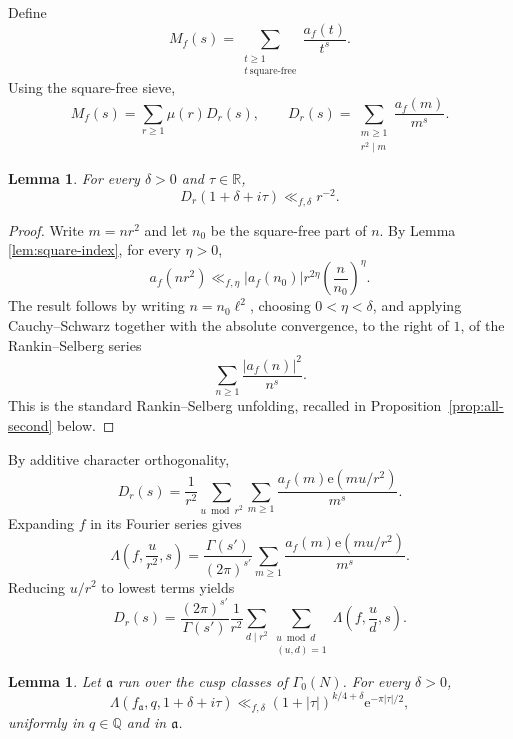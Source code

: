 \documentclass[11pt]{amsart}
\newtheorem{lemma}[theorem]{Lemma}
\theoremstyle{remark}
\newcommand{\e}{\mathrm{e}}
\newcommand{\R}{\mathbb R}
\newcommand{\Q}{\mathbb Q}
\begin{document}
Define
\[
M_f(s)=\sum_{\substack{t\ge1\\t\ \mathrm{square\text{-}free}}}\frac{a_f(t)}{t^s}.
\]
Using the square-free sieve,
\[
M_f(s)=\sum_{r\ge1}\mu(r)D_r(s),
\qquad
D_r(s)=\sum_{\substack{m\ge1\\r^2\mid m}}\frac{a_f(m)}{m^s}.
\tag{3.2}
\]

\begin{lemma}\label{lem:right-bound}
For every $\delta>0$ and $\tau\in\R$,
\[
D_r(1+\delta+i\tau)\ll_{f,\delta}r^{-2}.
\]
\end{lemma}

\begin{proof}
Write $m=nr^2$ and let $n_0$ be the square-free part of $n$. By Lemma \ref{lem:square-index}, for every $\eta>0$,
\[
a_f(nr^2)\ll_{f,\eta}|a_f(n_0)|r^{2\eta}\left(\frac n{n_0}\right)^\eta.
\]
The result follows by writing $n=n_0\ell^2$, choosing $0<\eta<\delta$, and applying Cauchy--Schwarz together with the absolute convergence, to the right of $1$, of the Rankin--Selberg series
\[
\sum_{n\ge1}\frac{|a_f(n)|^2}{n^s}.
\]
This is the standard Rankin--Selberg unfolding, recalled in
Proposition~\ref{prop:all-second} below.
\end{proof}

By additive character orthogonality,
\[
D_r(s)=\frac1{r^2}\sum_{u\bmod r^2}
\sum_{m\ge1}\frac{a_f(m)\e(mu/r^2)}{m^s}.
\tag{3.3}
\]
Expanding $f$ in its Fourier series gives
\[
\Lambda\left(f,\frac{u}{r^2},s\right)
=\frac{\Gamma(s')}{(2\pi)^{s'}}
\sum_{m\ge1}\frac{a_f(m)\e(mu/r^2)}{m^s}.
\]
Reducing $u/r^2$ to lowest terms yields
\[
D_r(s)=\frac{(2\pi)^{s'}}{\Gamma(s')}\frac1{r^2}
\sum_{d\mid r^2}\sum_{\substack{u\bmod d\\(u,d)=1}}
\Lambda\left(f,\frac ud,s\right).
\tag{3.4}
\]

\begin{lemma}\label{lem:cusp-uniform}
Let $\mathfrak a$ run over the cusp classes of $\Gamma_0(N)$. For every $\delta>0$,
\[
\Lambda(f_{\mathfrak a},q,1+\delta+i\tau)
\ll_{f,\delta}(1+|\tau|)^{k/4+\delta}\e^{-\pi|\tau|/2},
\]
uniformly in $q\in\Q$ and in $\mathfrak a$.
\end{lemma}
\end{document}
